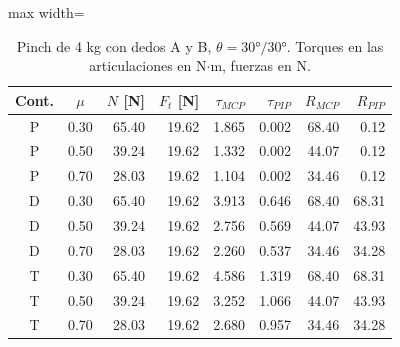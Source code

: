 \begin{table}[H]
\centering
\small
\begin{adjustbox}{max width=\textwidth}
\begin{tabular}{|c|c|r|r|r|r|r|r|}
\hline
\textbf{Cont.} & \textbf{$\mu$} & \textbf{$N$ [N]} & \textbf{$F_t$ [N]} & \textbf{$\tau_{MCP}$} & \textbf{$\tau_{PIP}$} & \textbf{$R_{MCP}$} & \textbf{$R_{PIP}$} \\ \hline
P & 0.30 & 65.40 & 19.62 & 1.865 & 0.002 & 68.40 & 0.12 \\ \hline
P & 0.50 & 39.24 & 19.62 & 1.332 & 0.002 & 44.07 & 0.12 \\ \hline
P & 0.70 & 28.03 & 19.62 & 1.104 & 0.002 & 34.46 & 0.12 \\ \hline
D & 0.30 & 65.40 & 19.62 & 3.913 & 0.646 & 68.40 & 68.31 \\ \hline
D & 0.50 & 39.24 & 19.62 & 2.756 & 0.569 & 44.07 & 43.93 \\ \hline
D & 0.70 & 28.03 & 19.62 & 2.260 & 0.537 & 34.46 & 34.28 \\ \hline
T & 0.30 & 65.40 & 19.62 & 4.586 & 1.319 & 68.40 & 68.31 \\ \hline
T & 0.50 & 39.24 & 19.62 & 3.252 & 1.066 & 44.07 & 43.93 \\ \hline
T & 0.70 & 28.03 & 19.62 & 2.680 & 0.957 & 34.46 & 34.28 \\ \hline
\end{tabular}
\end{adjustbox}
\caption{Pinch de 4 kg con dedos A y B, $\theta = 30°/30°$. Torques en las articulaciones en N$\cdot$m, fuerzas en N.}
\label{tab:pinch}
\end{table}